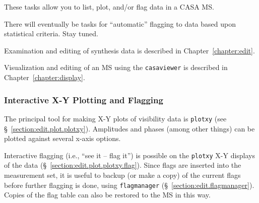 These tasks allow you to list, plot, and/or flag data in a CASA MS.

There will eventually be tasks for ``automatic'' flagging to
data based upon statistical criteria.  Stay tuned.

Examination and editing of synthesis data is described in
Chapter~\ref{chapter:edit}.

Visualization and editing of an MS using the {\tt casaviewer}
is described in Chapter~\ref{chapter:display}.

\subsubsection{Interactive X-Y Plotting and Flagging}
\label{section:intro.walkthru.flag.plotxy}

The principal tool for making X-Y plots of visibility data is
{\tt plotxy} (see \S~\ref{section:edit.plot.plotxy}).  Amplitudes and phases
(among other things) can be plotted against several x-axis options.

Interactive flagging (i.e., ``see it -- flag it'') is possible on the
{\tt plotxy} X-Y displays of the data
(\S~\ref{section:edit.plot.plotxy.flag}).  Since flags are inserted into the
measurement set, it is useful to backup (or make a copy) of the
current flags before further flagging is done, using {\tt flagmanager}
(\S~\ref{section:edit.flagmanager}).  Copies of the flag table can
also be restored to the MS in this way.


